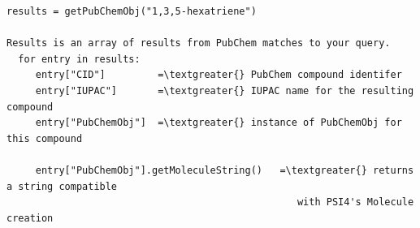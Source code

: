 \documentclass[letterpaper,10pt,english]{sphinxmanual}
\begin{document}
\begin{Verbatim}[commandchars=\\\{\}]
results = getPubChemObj("1,3,5-hexatriene")

Results is an array of results from PubChem matches to your query.
  for entry in results:
     entry["CID"]         =\textgreater{} PubChem compound identifer
     entry["IUPAC"]       =\textgreater{} IUPAC name for the resulting compound
     entry["PubChemObj"]  =\textgreater{} instance of PubChemObj for this compound

     entry["PubChemObj"].getMoleculeString()   =\textgreater{} returns a string compatible
                                                  with PSI4's Molecule creation
\end{Verbatim}
\end{document}
